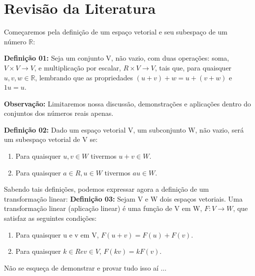 \chapter{Revisão da Literatura}
Começaremos pela definição de um espaço vetorial e seu subespaço de um número $\mathbb{R}$:

\textbf{Definição 01:} Seja um conjunto V, não vazio, com duas operações: soma, $V \times V \rightarrow V$, e multiplicação por escalar, $R \times V \rightarrow V$, tais que, para quaisquer $u, v, w \in \mathbb{R}$, lembrando que as propriedades $(u + v) + w = u + (v + w)$ e $1u = u$.

\textbf{Observação:} Limitaremos nossa discussão, demonstrações e aplicações dentro do conjuntos dos números reais apenas.

\textbf{Definição 02:} Dado um espaço vetorial V, um subconjunto W, não vazio, será um subespaço vetorial de V se:
\begin{enumerate}
	\item Para quaisquer $u, v \in W$ tivermos $u + v \in W$.
	\item Para quaisquer $a \in R, u \in W$ tivermos $au \in W$.
	\end{enumerate}

Sabendo tais definições, podemos expressar agora a definição de um transformação linear:
\textbf{Definição 03:} Sejam V e W dois espaços vetoriais. Uma transformação linear (aplicação linear) é uma função de V em W, $F:V \rightarrow W$, que satisfaz as seguintes condições:
\begin{enumerate}
	\item Para quaisquer u e v em V, $F(u + v) = F(u) + F(v)$.
	\item Para quaisquer $k \in R e v \in V$, $F(kv) = kF(v)$.
\end{enumerate}	

Não se esqueça de demonstrar e provar tudo isso aí $\ldots$